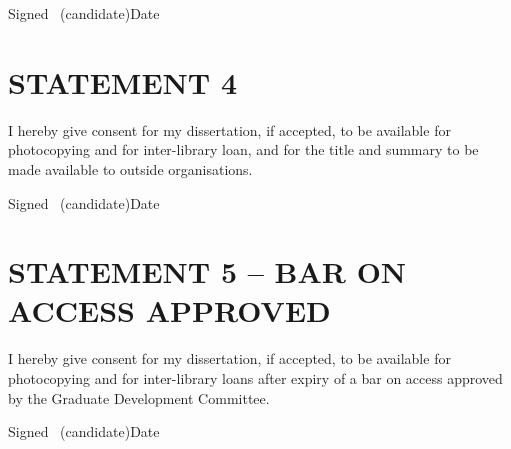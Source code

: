 \medskip
\noindent Signed \dotfill\ (candidate)\hfill Date \dotfill

\section*{STATEMENT 4}
I hereby give consent for my dissertation, if accepted, to be available for photocopying and for inter-library loan, and for the title and summary to be made available to outside organisations.

\medskip
\noindent Signed \dotfill\ (candidate)\hfill Date \dotfill

\section*{STATEMENT 5 -- BAR ON ACCESS APPROVED}
I hereby give consent for my dissertation, if accepted, to be available for photocopying and for inter-library loans after expiry of a bar on access approved by the Graduate Development Committee.

\medskip
\noindent Signed \dotfill\ (candidate)\hfill Date \dotfill
